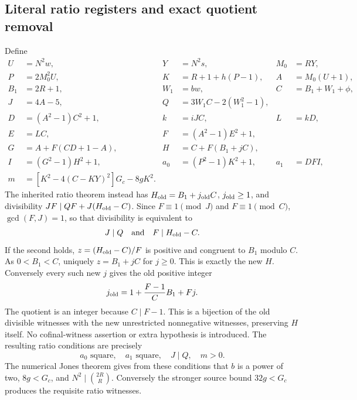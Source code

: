 \subsection{Literal ratio registers and exact quotient removal}
Define
\begin{align*}
 U&=N^2w,&Y&=N^2s,&M_0&=RY,\\
 P&=2M_0^2U,&K&=R+1+h(P-1),&A&=M_0(U+1),\\
 B_1&=2R+1,&W_1&=bw,&C&=B_1+W_1+\phi,\\
 J&=4A-5,&Q&=3W_1C-2(W_1^2-1),&&\\
 D&=(A^2-1)C^2+1,&k&=iJC,&L&=kD,\\
 E&=LC,&F&=(A^2-1)E^2+1,&&\\
 G&=A+F(CD+1-A),&H&=C+F(B_1+jC),&&\\
 I&=(G^2-1)H^2+1,&a_0&=(P^2-1)K^2+1,&a_1&=DFI,\\
 m&=[K^2-4(C-KY)^2]G_c-8gK^2.&&&&
\end{align*}
The inherited ratio theorem instead has $H_{\rm old}=B_1+j_{\rm old}C$,
$j_{\rm old}\ge1$, and divisibility
$JF\mid QF+J(H_{\rm old}-C)$. Since $F\equiv1\pmod J$ and
$F\equiv1\pmod C$, $\gcd(F,J)=1$, so that divisibility is equivalent to
\[
 J\mid Q\quad\hbox{and}\quad F\mid H_{\rm old}-C.
\]
If the second holds, $z=(H_{\rm old}-C)/F$ is positive and congruent to
$B_1$ modulo $C$. As $0<B_1<C$, uniquely $z=B_1+jC$ for $j\ge0$.
This is exactly the new $H$. Conversely every such new $j$ gives the old
positive integer
\[
 j_{\rm old}=1+\frac{F-1}{C}B_1+Fj.
\]
The quotient is an integer because $C\mid F-1$. This is a bijection of the
old divisible witnesses with the new unrestricted nonnegative witnesses,
preserving $H$ itself. No cofinal-witness assertion or extra hypothesis is
introduced. The resulting ratio conditions are precisely
\[
 a_0\text{ square},\quad a_1\text{ square},\quad J\mid Q,\quad m>0.
\]
The numerical Jones theorem gives from these conditions that $b$ is a power
of two, $8g<G_c$, and $N^2\mid\binom{2R}{R}$. Conversely the stronger
source bound $32g<G_c$ produces the requisite ratio witnesses.

